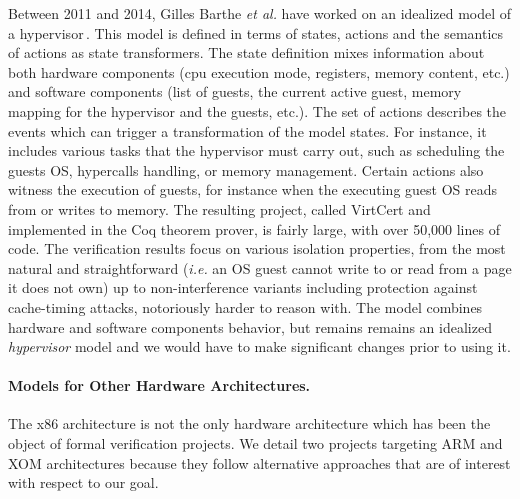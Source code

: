Between 2011 and 2014, Gilles Barthe \emph{et al.} have worked on an idealized
model of a
hypervisor\,\cite{barthe2011virtcert1,barthe2012virtcert2,barthe2014virtcert3}.
%
This model is defined in terms of states, actions and the semantics of actions
as state trans\-formers.
%
The state definition mixes information about both hardware components (\ac{cpu}
execution mode, registers, memory content, etc.) and software components (list
of guests, the current active guest, memory mapping for the hypervisor and the
guests, etc.).
%
The set of actions describes the events which can trigger a transformation of
the model states.
%
For instance, it includes various tasks that the hypervisor must carry out, such
as scheduling the guests OS, hypercalls handling, or memory management.
%
Certain actions also witness the execution of guests, for instance when the
executing guest OS reads from or writes to memory.
%
The resulting project, called VirtCert and implemented in the Coq theorem
prover, is fairly large, with over 50,000 lines of code.
%
The verification results focus on various isolation properties, from the most
natural and straightforward (\emph{i.e.} an OS guest cannot write to or read
from a page it does not own) up to non-interference variants including
protection against cache-timing attacks, notoriously harder to reason with.
%
The model combines hardware and software components behavior, but remains
remains an idealized \emph{hypervisor} model and we would have to make
significant changes prior to using it. 
%

\paragraph{Models for Other Hardware Architectures.}
%
The x86 architecture is not the only hardware architecture which has been the
object of formal verification projects.
%
We detail two projects targeting ARM and XOM architectures because they follow
alternative approaches that are of interest with respect to our goal.

